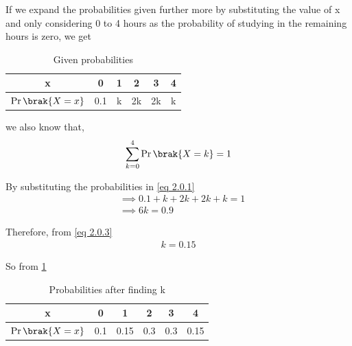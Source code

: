   
  If we expand the probabilities given further more by substituting the value of x and only considering 0 to 4 hours as the probability of studying in the remaining hours is zero, we get
  
  \begin{table}[ht]
  
 \centering
  
  \begin{tabular}{|c|c|c|c|c|c|}
    \hline
    x &  0 & 1 & 2 & 3 & 4\\
    \hline
    $\Pr\brak{X=x}$ & 0.1& k& 2k & 2k & k\\
    \hline
    
\end{tabular}
\caption{Given probabilities}
\label{Table_1}
\end{table}
we also know that,
\begin{align}
    \sum_{k = 0}^4 \Pr\brak{X = k} = 1 \label{eq 2.0.1}
\end{align}

By substituting the probabilities in \eqref{eq 2.0.1}
\begin{align}
& \implies 0.1 + k + 2k + 2k + k = 1 \\
& \implies 6k = 0.9 \label{eq 2.0.3}
\end{align}

Therefore, from \eqref{eq 2.0.3}
\begin{align}
    k = 0.15
\end{align}
  
 So from \ref{Table_1}
  \begin{table}[ht]
  
  \centering
  \begin{tabular}{|c|c|c|c|c|c|}
    \hline
    x &  0 & 1 & 2 & 3 & 4\\
    \hline
    $\Pr\brak{X=x}$ & 0.1& 0.15& 0.3 & 0.3 & 0.15\\
    \hline
    
\end{tabular} 
\caption{Probabilities after finding k}
\end{table}

